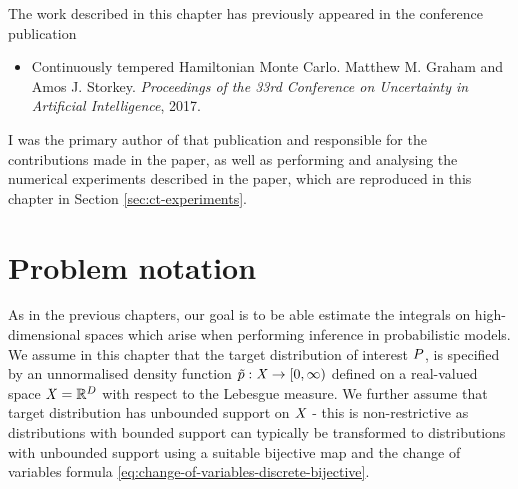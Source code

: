 

The work described in this chapter has previously appeared in the conference publication
\begin{itemize}
 \item Continuously tempered Hamiltonian Monte Carlo. Matthew M. Graham and Amos J. Storkey. \emph{Proceedings of the 33rd Conference on Uncertainty in Artificial Intelligence}, 2017.
\end{itemize}
I was the primary author of that publication and responsible for the contributions made in the paper, as well as performing and analysing the numerical experiments described in the paper, which are reproduced in this chapter in Section \ref{sec:ct-experiments}.

\section{Problem notation}

As in the previous chapters, our goal is to be able estimate the integrals on high-dimensional spaces which arise when performing inference in probabilistic models. We assume in this chapter that the target distribution of interest $P$, is specified by an {unnormalised} density function $\tilde{p} : \mathit{X} \to [0,\infty)$ defined on a real-valued space $\mathit{X} = \mathbb{R}^D$ with respect to the Lebesgue measure. We further assume that target distribution has unbounded support on $\mathit{X}$ - this is non-restrictive as distributions with bounded support can typically be transformed to distributions with unbounded support using a suitable bijective map and the change of variables formula \eqref{eq:change-of-variables-discrete-bijective}.

